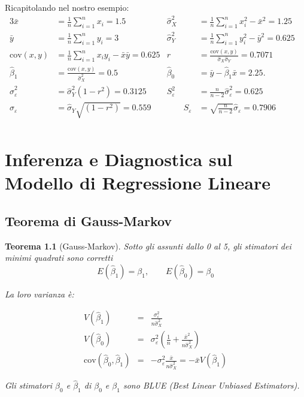 \documentclass[
  11pt,
]{book}
\theoremstyle{mytheoremstyle}
\newtheorem{theorem}{Teorema}[section]
\theoremstyle{mydefstyle}
\begin{document}
Ricapitolando nel nostro esempio:
\begin{alignat*}{3}
 \bar x & =  \frac 1 n \sum_{i=1}^n x_i  = 1.5 &
\hat\sigma_X^2 & =  \frac 1 n \sum_{i=1}^n x_i^2 - \bar x^2  = 1.25 &\\
 \bar y & =  \frac 1 n \sum_{i=1}^n y_i   = 3 &
\hat\sigma_Y^2 & =  \frac 1 n \sum_{i=1}^n y_i^2 - \bar y^2  = 0.625 &\\
 \text{cov}(x,y) & = \frac 1 n \sum_{i=1}^n x_iy_i -\bar x\bar y  = 0.625 & 
r & = \frac{\text{cov}(x,y)}{\hat\sigma_X \hat\sigma_Y }  = 0.7071 &\\
\hat\beta_1 & = \frac{\text{cov}(x,y)}{\hat\sigma_X^2} = 0.5 & 
\hat\beta_0 & = \bar y  - \hat\beta_1\bar x = 2.25. &\\
\hat\sigma_\varepsilon^2 & = \hat\sigma_Y^2(1-r^2)=0.3125 &
S_\varepsilon^2 & = \frac{n}{n-2}\hat\sigma_\varepsilon^2 = 0.625\\
\hat\sigma_\varepsilon & = \hat\sigma_Y\sqrt{(1-r^2)}=0.559 & \qquad
S_\varepsilon & = \sqrt{\frac{n}{n-2}}\hat\sigma_\varepsilon = 0.7906\\
\end{alignat*}

\chapter{Inferenza e Diagnostica sul Modello di Regressione Lineare}\label{inferenza-e-diagnostica-sul-modello-di-regressione-lineare}

\section{Teorema di Gauss-Markov}\label{teorema-di-gauss-markov}

\begin{info}

\begin{theorem}[Gauss-Markov]
Sotto gli assunti dallo 0 al 5,
gli stimatori dei minimi quadrati sono corretti
\[E(\hat\beta_1)=\beta_1,\qquad E(\hat\beta_0)=\beta_0\]

La loro varianza è:

\begin{eqnarray*}
    V(\hat\beta_{1}) &=& \frac{\sigma_{\varepsilon}^{2}} {n \hat{\sigma}^{2}_{X}} \\
    V(\hat\beta_{0}) &=& \sigma_{\varepsilon}^{2} \left( \frac{1} {n}  +  \frac{\bar{x}^{2}} {n \hat{\sigma}^{2}_{X}} \right)   \\
    \mbox{cov}(\hat\beta_{0}, \hat\beta_{1}) &=& - \sigma_{\varepsilon}^{2} \frac{\bar{x}} {n \hat{\sigma}^{2}_{X}}
 =  - \bar{x} V(\hat\beta_{1})
\end{eqnarray*}

Gli stimatori \(\hat\beta_{0}\) e \(\hat\beta_{1}\) di \(\beta_{0}\) e \(\beta_{1}\)
sono \emph{BLUE (Best Linear Unbiased Estimators)}.
\end{theorem}

\end{info}
\end{document}
